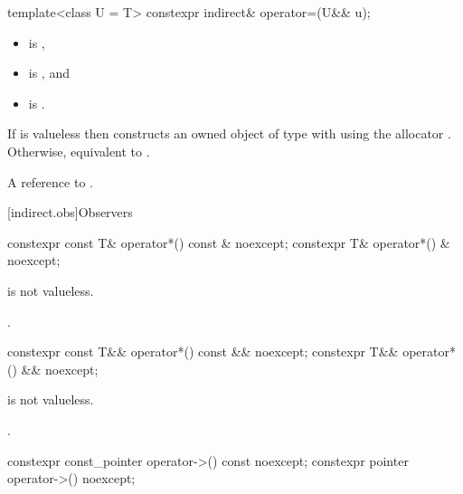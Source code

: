 %
\begin{itemdecl}
template<class U = T>
  constexpr indirect& operator=(U&& u);
\end{itemdecl}

\begin{itemdescr}
\pnum
\constraints
\begin{itemize}
\item
{} is ,
\item
{} is , and
\item
{} is .
\end{itemize}

\pnum
\effects
If  is valueless then
constructs an owned object of type  with 
using the allocator .
Otherwise,
equivalent to .

\pnum
\returns
A reference to .
\end{itemdescr}

[indirect.obs]{Observers}

%
\begin{itemdecl}
constexpr const T& operator*() const & noexcept;
constexpr T& operator*() & noexcept;
\end{itemdecl}

\begin{itemdescr}
\pnum
\expects
{} is not valueless.

\pnum
\returns
{}.
\end{itemdescr}

%
\begin{itemdecl}
constexpr const T&& operator*() const && noexcept;
constexpr T&& operator*() && noexcept;
\end{itemdecl}

\begin{itemdescr}
\pnum
\expects
{} is not valueless.

\pnum
\returns
{}.
\end{itemdescr}

%
\begin{itemdecl}
constexpr const_pointer operator->() const noexcept;
constexpr pointer operator->() noexcept;
\end{itemdecl}

